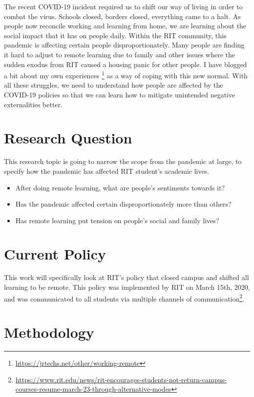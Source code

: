 \documentclass[12pt,
 reprint,
nofootinbib,
 amsmath,amssymb,
 aps,
]{revtex4-2}
\begin{document}
The recent COVID-19 incident required us to shift our way of living in order to combat the virus. Schools closed, borders closed, everything came to a halt. As people now reconcile working and learning from home, we are learning about the social impact that it has on people daily. Within the RIT community, this pandemic is affecting certain people disproportionately. Many people are finding it hard to adjust to remote learning due to family and other issues where the sudden exodus from RIT caused a housing panic for other people. I have blogged a bit about my own experiences \footnote{\url{https://jrtechs.net/other/working-remote}} as a way of coping with this new normal. With all these struggles, we need to understand how people are affected by the COVID-19 policies so that we can learn how to mitigate unintended negative externalities better. 

\section{Research Question}

This research topic is going to narrow the scope from the pandemic at large, to specify how the pandemic has affected RIT student's academic lives.

\begin{itemize}
    \item After doing remote learning, what are people's sentiments towards it?
    \item Has the pandemic affected certain disproportionately more than others?
    \item Has remote learning put tension on people's social and family lives?
\end{itemize}

\section{Current Policy}

This work will specifically look at RIT's policy that closed campus and shifted all learning to be remote. This policy was implemented by RIT on March 15th, 2020, and was communicated to all students via multiple channels of communication\footnote{\url{https://www.rit.edu/news/rit-encourages-students-not-return-campus-courses-resume-march-23-through-alternative-modes}}.

\section{Methodology}
\end{document}
